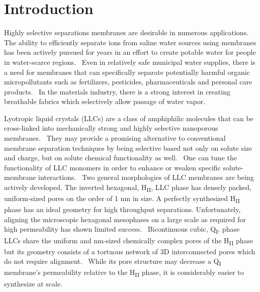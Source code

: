 \documentclass[aps,pre,preprint,groupedaddress,longbibliography]{revtex4-2}
\begin{document}
  \maketitle
  
  \graphicspath{{./figures/}}

  \section{Introduction}

  Highly selective separations membranes are desirable in numerous applications. 
  The ability to efficiently separate ions from saline water sources using membranes 
  has been actively pursued for years in an effort to create potable water for people 
  in water-scarce regions.~\cite{werber_materials_2016} Even in relatively safe
  municipal water supplies, there is a need for membranes that can specifically separate
  potentially harmful organic micropollutants such as fertilizers, pesticides, pharmaceuticals
  and personal care products.~\cite{barbosa_occurrence_2016} In the materials industry,
  there is a strong interest in creating breathable fabrics which selectively allow 
  passage of water vapor.~\cite{mondloch_destruction_2015}

  Lyotropic liquid crystals (LLCs) are a class of amphiphilic molecules that can be 
  cross-linked into mechanically strong and highly selective nanoporous membranes.~\cite{gin_polymerized_2008}
  They may provide a promising alternative to conventional membrane separation techniques
  by being selective based not only on solute size and charge, but on solute chemical 
  functionality as well.~\cite{dischinger_application_2017} One can tune the functionality
  of LLC monomers in order to enhance or weaken specific solute-membrane interactions.~\cite{dischinger_effect_2017}
  Two general morphologies of LLC membranes are being actively developed. The inverted hexagonal, 
  H\textsubscript{II}, LLC phase has densely packed, uniform-sized pores on the order of 1 nm
  in size. A perfectly synthesized H\textsubscript{II} phase has an ideal geometry for high
  throughput separations. Unfortunately, aligning the microscopic hexagonal mesophases on 
  a large scale as required for high permeability has shown limited success.~\cite{feng_scalable_2014,feng_thin_2016} Bicontinuous cubic,
  Q\textsubscript{I}, phase LLCs share the uniform and nm-sized chemically complex pores of
  the H\textsubscript{II} phase but its geometry consists of a tortuous network of 3D 
  interconnected pores which do not require alignment.~\cite{carter_glycerol-based_2012} While 
  its pore structure may decrease a Q\textsubscript{I} membrane's permeability relative to the
  H\textsubscript{II} phase, it is considerably easier to synthesize at scale.~\cite{hatakeyama_nanoporous_2010}
  
\end{document}
